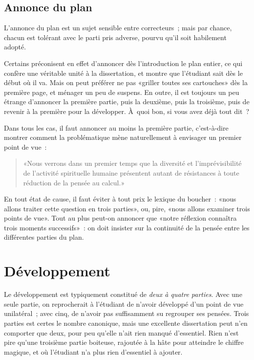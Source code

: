\documentclass[a4paper,11pt]{article}
\newcommand{\cad}{c'est-à-dire}
\begin{document}
\par








\subsection{Annonce du plan}

L'annonce du plan est un sujet sensible entre correcteurs~; mais par
chance, chacun est tolérant avec le parti pris adverse, pourvu qu'il
soit habilement adopté. 

\par

Certains préconisent en effet d'annoncer dès l'introduction le plan
entier, ce qui confère une véritable unité à la dissertation, et montre
que l'étudiant sait dès le début où il va. Mais on peut préférer ne pas
«griller toutes ses cartouches» dès la première page, et ménager un peu
de suspens. En outre, il est toujours un peu étrange d'annoncer la
première partie, puis la deuxième, puis la troisième, puis de revenir à
la première pour la développer. À~quoi bon, si vous avez déjà tout dit~?

\par

Dans tous les cas, il faut annoncer au moins la première partie, \cad{}
montrer comment la problématique mène naturellement à envisager un
premier point de vue~:
\begin{quote}
  «Nous verrons dans un premier temps que la diversité et
  l'imprévisibilité de l'activité spirituelle humaine présentent autant
  de résistances à toute réduction de la pensée au calcul.»
\end{quote}

\par

En tout état de cause, il faut éviter à tout prix le lexique du
boucher~: «nous allons traiter cette question en trois parties», ou,
pire, «nous allons examiner trois points de vue». Tout au plus peut-on
annoncer que «notre réflexion connaîtra trois moments successifs»~: on
doit insister sur la continuité de la pensée entre les différentes
parties du plan.


\section{Développement}

Le développement est typiquement constitué de \emph{deux à quatre
  parties}. Avec une seule partie, on reprocherait à l'étudiant de
n'avoir développé d'un point de vue unilatéral~; avec cinq, de n'avoir
pas suffisamment su regrouper ses pensées. Trois parties est certes le
nombre canonique, mais une excellente dissertation peut n'en comporter
que deux, pour peu qu'elle n'ait rien manqué d'essentiel. Rien n'est
pire qu'une troisième partie boiteuse, rajoutée à la hâte pour atteindre
le chiffre magique, et où l'étudiant n'a plus rien d'essentiel à
ajouter.
\end{document}
